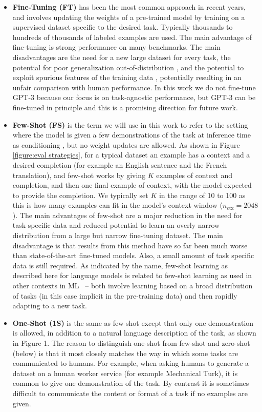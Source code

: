 \begin{itemize}
    \item \textbf{Fine-Tuning (FT)} has been the most common approach in recent years, and involves updating the weights of a pre-trained model by training on a supervised dataset specific to the desired task.  Typically thousands to hundreds of thousands of labeled examples are used.  The main advantage of fine-tuning is strong performance on many benchmarks. The main disadvantages are the need for a new large dataset for every task, the potential for poor generalization out-of-distribution \cite{mccoy2019right}, and the potential to exploit spurious features of the training data \cite{ gururangan2018annotation, niven2019probing}, potentially resulting in an unfair comparison with human performance. In this work we do not fine-tune GPT-3 because our focus is on task-agnostic performance, but GPT-3 can be fine-tuned in principle and this is a promising direction for future work.
    \item \textbf{Few-Shot (FS)} is the term we will use in this work to refer to the setting where the model is given a few demonstrations of the task at inference time as conditioning \cite{radford2019language}, but no weight updates are allowed.  As shown in Figure \ref{figure:eval strategies}, for a typical dataset an example has a context and a desired completion (for example an English sentence and the French translation), and few-shot works by giving $K$ examples of context and completion, and then one final example of context, with the model expected to provide the completion.  We typically set $K$ in the range of 10 to 100 as this is how many examples can fit in the model’s context window ($n_{\mathrm{ctx}}=2048$).  The main advantages of few-shot are a major reduction in the need for task-specific data and reduced potential to learn an overly narrow distribution from a large but narrow fine-tuning dataset. The main disadvantage is that results from this method have so far been much worse than state-of-the-art fine-tuned models.  Also, a small amount of task specific data is still required. As indicated by the name, few-shot learning as described here for language models is related to few-shot learning as used in other contexts in ML~\citep{hochreiter2001learning, vinyals2016matching} -- both involve learning based on a broad distribution of tasks (in this case implicit in the pre-training data) and then rapidly adapting to a new task.
    \item \textbf{One-Shot (1S)} is the same as few-shot except that only one demonstration is allowed, in addition to a natural language description of the task, as shown in Figure 1. The reason to distinguish one-shot from few-shot and zero-shot (below) is that it most closely matches the way in which some tasks are communicated to humans.  For example, when asking humans to generate a dataset on a human worker service (for example Mechanical Turk), it is common to give one demonstration of the task.  By contrast it is sometimes difficult to communicate the content or format of a task if no examples are given.

\end{itemize}
